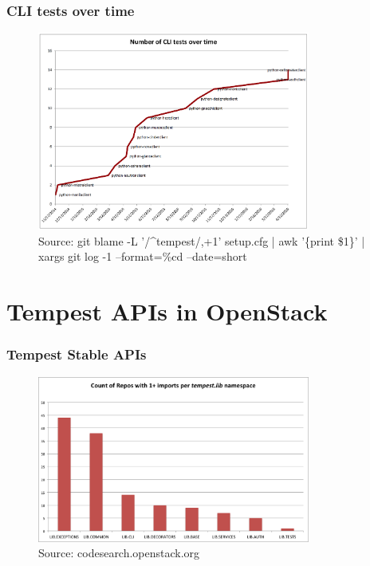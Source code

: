 \documentclass[aspectratio=169,11pt,hyperref={colorlinks=true}]{beamer}
\begin{document}
\begin{frame}
    \frametitle{CLI tests over time}
    \begin{figure}[p]
    	\centering
    	\includegraphics[width=0.8\textwidth]{cli-tests.png}
        \caption{Source: git blame -L '/\^{}tempest/,+1' setup.cfg | awk '\{print \$1\}' | xargs git log -1 --format=\%cd --date=short}
    \end{figure}
\end{frame}

\section{Tempest APIs in OpenStack}
\begin{frame}
    \frametitle{Tempest Stable APIs}
    \begin{figure}[p]
    	\centering
    	\includegraphics[width=0.8\textwidth]{lib_import_per_namespace.png}
    	\caption{Source: codesearch.openstack.org}
    \end{figure}
\end{frame}
\end{document}
